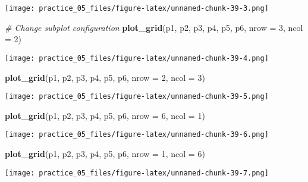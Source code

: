 \documentclass[
]{article}
\newenvironment{Shaded}{\begin{snugshade}}{\end{snugshade}}
\newcommand{\AttributeTok}[1]{\textcolor[rgb]{0.13,0.29,0.53}{#1}}
\newcommand{\CommentTok}[1]{\textcolor[rgb]{0.56,0.35,0.01}{\textit{#1}}}
\newcommand{\DecValTok}[1]{\textcolor[rgb]{0.00,0.00,0.81}{#1}}
\newcommand{\FunctionTok}[1]{\textcolor[rgb]{0.13,0.29,0.53}{\textbf{#1}}}
\newcommand{\NormalTok}[1]{#1}
\begin{document}
\texttt{[image: practice\_05\_files/figure-latex/unnamed-chunk-39-3.png]}

\begin{Shaded}
\begin{Highlighting}[]
\CommentTok{\#   Change subplot configuration}
\FunctionTok{plot\_grid}\NormalTok{(p1, p2, p3, p4, p5, p6, }\AttributeTok{nrow =} \DecValTok{3}\NormalTok{, }\AttributeTok{ncol =} \DecValTok{2}\NormalTok{)}
\end{Highlighting}
\end{Shaded}

\texttt{[image: practice\_05\_files/figure-latex/unnamed-chunk-39-4.png]}

\begin{Shaded}
\begin{Highlighting}[]
\FunctionTok{plot\_grid}\NormalTok{(p1, p2, p3, p4, p5, p6, }\AttributeTok{nrow =} \DecValTok{2}\NormalTok{, }\AttributeTok{ncol =} \DecValTok{3}\NormalTok{)}
\end{Highlighting}
\end{Shaded}

\texttt{[image: practice\_05\_files/figure-latex/unnamed-chunk-39-5.png]}

\begin{Shaded}
\begin{Highlighting}[]
\FunctionTok{plot\_grid}\NormalTok{(p1, p2, p3, p4, p5, p6, }\AttributeTok{nrow =} \DecValTok{6}\NormalTok{, }\AttributeTok{ncol =} \DecValTok{1}\NormalTok{)}
\end{Highlighting}
\end{Shaded}

\texttt{[image: practice\_05\_files/figure-latex/unnamed-chunk-39-6.png]}

\begin{Shaded}
\begin{Highlighting}[]
\FunctionTok{plot\_grid}\NormalTok{(p1, p2, p3, p4, p5, p6, }\AttributeTok{nrow =} \DecValTok{1}\NormalTok{, }\AttributeTok{ncol =} \DecValTok{6}\NormalTok{)}
\end{Highlighting}
\end{Shaded}

\texttt{[image: practice\_05\_files/figure-latex/unnamed-chunk-39-7.png]}
\end{document}
